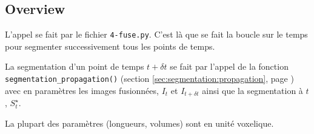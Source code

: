 \documentclass{article}
\begin{document}
\subsection{Overview}

L'appel se fait par le fichier \texttt{4-fuse.py}. C'est l\`a que se fait la boucle sur le temps pour segmenter successivement tous les points de temps. 

La segmentation d'un point de temps $t + \delta t$ se fait par l'appel de la fonction \texttt{segmentation\_propagation()} (section \ref{sec:segmentation:propagation}, page \pageref{sec:segmentation:propagation}) avec en param\`etres les images fusionn\'ees, $I_{t}$ et $I_{t + \delta t}$ ainsi que la segmentation \`a $t$, $S^{\star}_t$.

La plupart des param\`etres (longueurs, volumes) sont en unit\'e voxelique.
\end{document}
